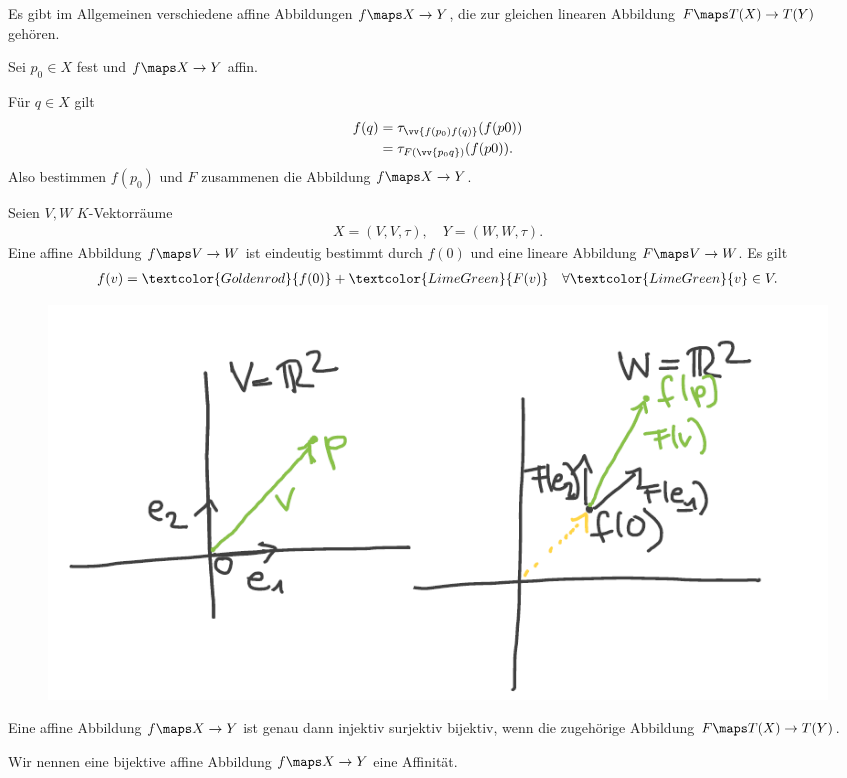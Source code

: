 \begin{bemerkung*}
    \begin{eigenschaftenenumerate}
        \item Es gibt im Allgemeinen verschiedene affine Abbildungen \( f\maps X \to Y \), die zur gleichen linearen Abbildung \( F\maps T(X)\to T(Y) \) gehören.
        \item Sei \( p_0 \in X \) fest und \( f\maps X \to Y \) affin.
        
        Für \( q\in X \) gilt
        \begin{align*}
            f(q)\begin{aligned}[t] 
                &=\tau_{\vv{f(p_0)f(q)}}(f(p0))\\
            &=\tau_{F(\vv{p_0 q})}(f(p0)).
            \end{aligned}
        \end{align*}
        Also bestimmen \( f(p_0) \) und \( F \) zusammenen die Abbildung \( f\maps X\to Y \).
    \end{eigenschaftenenumerate}


\end{bemerkung*}
\begin{beispiel*}
    Seien \( V,W \) \( K \)-Vektorräume
    \begin{align*}
        X=(V,V,\tau),\quad Y=(W,W,\tau).
    \end{align*}
    Eine affine Abbildung \( f\maps V\to W \) ist eindeutig bestimmt durch \( f(0) \) und eine lineare Abbildung \( F\maps V\to W \). Es gilt
    \begin{align*}
        f(v)=\textcolor{Goldenrod}{f(0)}+\textcolor{LimeGreen}{F(v)}\quad\forall \textcolor{LimeGreen}{v} \in V.
    \end{align*}
\end{beispiel*}
\begin{figure}[H]
    \centering
    \includegraphics[width=0.7\linewidth]{figures/affine_abbildungen_vektorraeume}
    \label{fig:affine_abbildungen_vektorraeume}
\end{figure}
\begin{bemuebung*}
    Eine affine Abbildung \( f\maps X \to Y \) ist genau dann injektiv \bzw surjektiv \bzw bijektiv, wenn die zugehörige Abbildung \( F\maps T(X)\to T(Y) \).
\end{bemuebung*}
\begin{definition*}
    Wir nennen eine bijektive affine Abbildung \( f\maps X \to Y \) eine Affinität.
\end{definition*}
